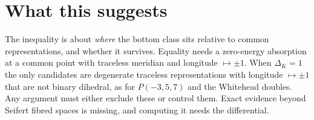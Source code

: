 \documentclass[10pt]{amsart}
\begin{document}
\section{What this suggests}

The inequality is about \emph{where} the bottom class sits relative to common
representations, and whether it survives. Equality needs a zero-energy
absorption at a common point with traceless meridian and longitude
$\mapsto\pm1$. When $\Delta_K=1$ the only candidates are degenerate traceless
representations with longitude $\mapsto\pm1$ that are not binary dihedral,
as for $P(-3,5,7)$ and the Whitehead doubles. Any argument must either exclude
these or control them. Exact evidence beyond Seifert fibred spaces is missing,
and computing it needs the differential.
\end{document}
